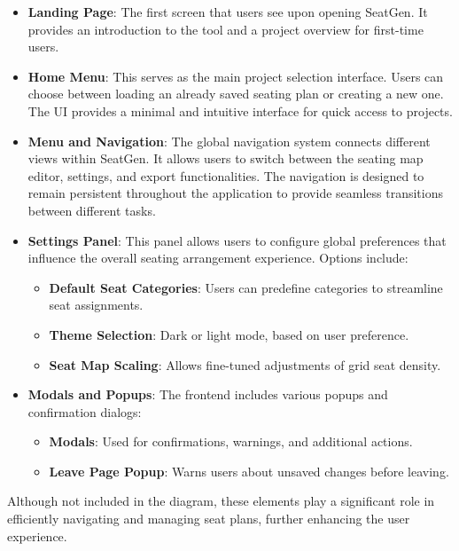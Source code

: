\begin{itemize}
    \item \textbf{Landing Page}: The first screen that users see upon opening SeatGen. It provides an introduction to the tool and a project overview for first-time users.
    
    \item \textbf{Home Menu}: This serves as the main project selection interface. Users can choose between loading an already saved seating plan or creating a new one. The UI provides a minimal and intuitive interface for quick access to projects.
    
    \item \textbf{Menu and Navigation}: The global navigation system connects different views within SeatGen. It allows users to switch between the seating map editor, settings, and export functionalities. The navigation is designed to remain persistent throughout the application to provide seamless transitions between different tasks.
    
    \item \textbf{Settings Panel}: This panel allows users to configure global preferences that influence the overall seating arrangement experience. Options include:
    \begin{itemize}
        \item \textbf{Default Seat Categories}: Users can predefine categories to streamline seat assignments.
        \item \textbf{Theme Selection}: Dark or light mode, based on user preference.
        \item \textbf{Seat Map Scaling}: Allows fine-tuned adjustments of grid seat density.
    \end{itemize}
    
    \item \textbf{Modals and Popups}: The frontend includes various popups and confirmation dialogs:
    \begin{itemize}
        \item \textbf{Modals}: Used for confirmations, warnings, and additional actions.
        \item \textbf{Leave Page Popup}: Warns users about unsaved changes before leaving.
    \end{itemize}
\end{itemize}

Although not included in the diagram, these elements play a significant role in efficiently navigating and managing seat plans, further enhancing the user experience.


